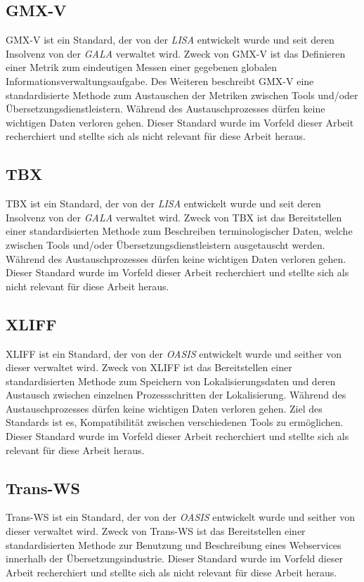 \subsection{GMX-V}
\ac{GMX-V} ist ein Standard, der von der \textit{\ac{LISA}} entwickelt wurde und seit deren Insolvenz von der \textit{\ac{GALA}} verwaltet wird. Zweck von \ac{GMX-V} ist das Definieren einer Metrik zum eindeutigen Messen einer gegebenen globalen Informationsverwaltungsaufgabe. Des Weiteren beschreibt \ac{GMX-V} eine standardisierte Methode zum Austauschen der Metriken zwischen Tools und/oder Übersetzungsdienstleistern. Während des Austauschprozesses dürfen keine wichtigen Daten verloren gehen. Dieser Standard wurde im Vorfeld dieser Arbeit recherchiert und stellte sich als nicht relevant für diese Arbeit heraus.
\autocite[Vgl.][]{Zydron.2007}
\subsection{TBX}
\ac{TBX} ist ein Standard, der von der \textit{\ac{LISA}} entwickelt wurde und seit deren Insolvenz von der \textit{\ac{GALA}} verwaltet wird. Zweck von \ac{TBX} ist das Bereitstellen einer standardisierten Methode zum Beschreiben terminologischer Daten, welche zwischen Tools und/oder Übersetzungsdienstleistern ausgetauscht werden. Während des Austauschprozesses dürfen keine wichtigen Daten verloren gehen. Dieser Standard wurde im Vorfeld dieser Arbeit recherchiert und stellte sich als nicht relevant für diese Arbeit heraus.
\autocite[Vgl.][S. vii]{GALA.2008}
\subsection{XLIFF}
\ac{XLIFF} ist ein Standard, der von der \textit{\ac{OASIS}} entwickelt wurde und seither von dieser verwaltet wird. Zweck von \ac{XLIFF} ist das Bereitstellen einer standardisierten Methode zum Speichern von Lokalisierungsdaten und deren Austausch zwischen einzelnen Prozessschritten der Lokalisierung. Während des Austauschprozesses dürfen keine wichtigen Daten verloren gehen. Ziel des Standards ist es, Kompatibilität zwischen verschiedenen Tools zu ermöglichen. Dieser Standard wurde im Vorfeld dieser Arbeit recherchiert und stellte sich als relevant für diese Arbeit heraus.
\autocite[Vgl.][]{Schnabel.2014}
\subsection{Trans-WS}
\ac{Trans-WS} ist ein Standard, der von der \textit{\ac{OASIS}} entwickelt wurde und seither von dieser verwaltet wird. Zweck von \ac{Trans-WS} ist das Bereitstellen einer standardisierten Methode zur Benutzung und Beschreibung eines Webservices innerhalb der Übersetzungsindustrie. Dieser Standard wurde im Vorfeld dieser Arbeit recherchiert und stellte sich als nicht relevant für diese Arbeit heraus.
\autocite[Vgl.][]{Reynolds.2006}
